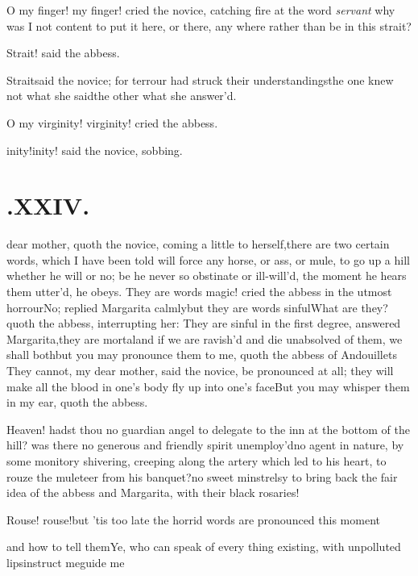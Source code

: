 \documentclass{article}
\begin{document}
O my finger! my finger! cried the novice, catching fire at the
word \textit{servant}
\tsk why was I not content to put it here, or
there, any where rather than be in this strait?

\tsh Strait! said the abbess.

Strait\tsh said the novice; for terrour had struck their
understandings\tsh the one knew not what she
said\tsh the other what she answer’d.

O my virginity! virginity! cried the abbess.

\tsh inity!\tsh inity! said the novice,
sobbing.

\vfill{}\eject
\null\smallskip

\section{.\enspace XXIV.}

 dear mother, quoth the novice,
coming a little to herself,\tsh there are two certain words,
which I have been told will force any horse, or ass, or mule, to go
up a hill whether he will or no; be he never so obstinate or
ill-will’d, the moment he hears them utter’d, he obeys.
They are words magic! cried the abbess in the utmost
horrour\tsk No; replied Margarita calmly\tsk but they are
words sinful\tsk What are they? quoth the abbess, interrupting
her: They are sinful in the first degree, answered
Margarita,\break\tsk they are mortal\tsk and if we are
ravish’d and die unabsolved of them, we shall
both\tsh but you may pronounce them to me, quoth the
abbess of Andouillets\break
\tsh They cannot, my dear
mother, said the novice, be pronounced at all; they will make all
the blood in one’s body fly up into one’s
face\tsk But you may whisper them in my ear, quoth the
abbess.

Heaven! hadst thou no guardian angel to delegate to the inn at
the bottom of the hill? was there no generous and friendly spirit
unemploy’d\tsh no agent in nature, by some monitory
shivering, creeping along the artery which led to his heart, to
rouze the muleteer from his banquet?\tsh no sweet
minstrelsy to bring back the fair idea of the abbess and
Margarita, with their black rosaries!

Rouse! rouse!\tsh but ’tis too late\tsk\break
the horrid words are pronounced this moment\tsh{}

\tsh and how to tell them\tsk Ye, who can speak of
every thing existing, with unpolluted lips\tsk instruct
me\tsh guide me\tsh
\end{document}
